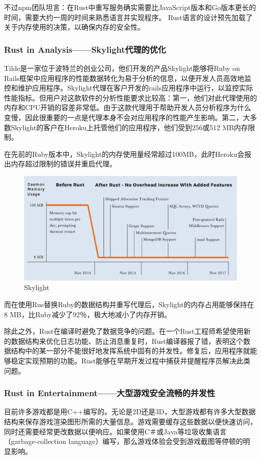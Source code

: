 \documentclass[12pt, a4paper]{article}
\begin{document}
		不过npm团队坦言：在Rust中重写服务确实需要比JavaScript版本和Go版本更长的时间，需要大约一周的时间来熟悉语言并实现程序。 Rust语言的设计预先加载了关于内存使用的决策，以确保内存的安全性。

		\subsubsection{Rust in Analysis——Skylight代理的优化}
		Tilde是一家位于波特兰的创业公司，他们开发的产品Skylight能够将Ruby on Rails框架中应用程序的性能数据转化为易于分析的信息，以便开发人员高效地监控和维护应用程序。Skylight代理在客户开发的rails应用程序中运行，以监控实际性能指标。但用户对这款软件的分析性能要求比较高：第一，他们对此代理使用的内存和CPU开销的容差非常低。由于这款代理用于帮助开发人员分析程序为什么变慢，因此很重要的一点是代理本身不会对应用程序的性能产生影响。第二，大多数Skylight的客户在Heroku上托管他们的应用程序，他们受到256或512 MB内存限制。
		
		在先前的Ruby版本中，Skylight的内存使用量经常超过100MB，此时Heroku会报出内存超过限制的错误并重启代理。
		\begin{figure}[H]
			\centering
			\includegraphics[width=0.7\linewidth]{Z2}
			\caption{Skylight}
			\label{fig:southeast2}
		\end{figure}
		而在使用Rus替换Ruby的数据结构并重写代理后，Skylight的内存占用能够保持在8 MB，比Ruby减少了92％，极大地减小了内存开销。
		
		除此之外，Rust在编译时避免了数据竞争的问题。在一个Rust工程师希望使用新的数据结构来优化日志功能、防止消息重复时，Rust编译器报了错，表明这个数据结构中的某一部分不能很好地发挥系统中固有的并发性。修复后，应用程序就能够稳定实现预期的功能。Rust能够在早期开发过程中捕获并提醒程序员解决此类问题。
		
		\subsubsection{Rust in Entertainment——大型游戏安全流畅的并发性}
		目前许多游戏都是用C++编写的。无论是2D还是3D，大型游戏都有许多大型数据结构来保存游戏渲染图形所需的大量信息。游戏需要缓存这些数据以便快速访问，同时还需要经常更改数据以便响应。如果使用C＃或Java等垃圾收集语言（garbage-collection language）编写，那么游戏体验会受到游戏截图等停顿的明显影响。
		
\end{document}
